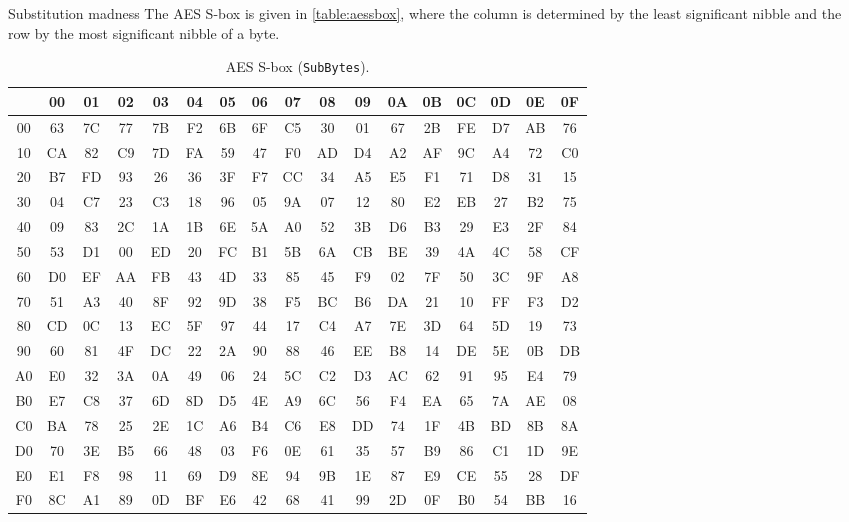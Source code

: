 \documentclass{practice}
\begin{document}
\begin{task}{Substitution madness}
  The AES S-box is given in \autoref{table:aessbox}, where the column is determined by the least significant nibble and the row by the most significant nibble of a byte.
  \begin{table}[h!]
    \centering
    \ttfamily
    \begin{tabular}{@{}c|cccccccccccccccc@{}}
         & 00 & 01 & 02 & 03 & 04 & 05 & 06 & 07 & 08 & 09 & 0A & 0B & 0C & 0D & 0E & 0F\\
      \midrule
      00 & 63 & 7C & 77 & 7B & F2 & 6B & 6F & C5 & 30 & 01 & 67 & 2B & FE & D7 & AB & 76\\
      10 & CA & 82 & C9 & 7D & FA & 59 & 47 & F0 & AD & D4 & A2 & AF & 9C & A4 & 72 & C0\\
      20 & B7 & FD & 93 & 26 & 36 & 3F & F7 & CC & 34 & A5 & E5 & F1 & 71 & D8 & 31 & 15\\
      30 & 04 & C7 & 23 & C3 & 18 & 96 & 05 & 9A & 07 & 12 & 80 & E2 & EB & 27 & B2 & 75\\
      40 & 09 & 83 & 2C & 1A & 1B & 6E & 5A & A0 & 52 & 3B & D6 & B3 & 29 & E3 & 2F & 84\\
      50 & 53 & D1 & 00 & ED & 20 & FC & B1 & 5B & 6A & CB & BE & 39 & 4A & 4C & 58 & CF\\
      60 & D0 & EF & AA & FB & 43 & 4D & 33 & 85 & 45 & F9 & 02 & 7F & 50 & 3C & 9F & A8\\
      70 & 51 & A3 & 40 & 8F & 92 & 9D & 38 & F5 & BC & B6 & DA & 21 & 10 & FF & F3 & D2\\
      80 & CD & 0C & 13 & EC & 5F & 97 & 44 & 17 & C4 & A7 & 7E & 3D & 64 & 5D & 19 & 73\\
      90 & 60 & 81 & 4F & DC & 22 & 2A & 90 & 88 & 46 & EE & B8 & 14 & DE & 5E & 0B & DB\\
      A0 & E0 & 32 & 3A & 0A & 49 & 06 & 24 & 5C & C2 & D3 & AC & 62 & 91 & 95 & E4 & 79\\
      B0 & E7 & C8 & 37 & 6D & 8D & D5 & 4E & A9 & 6C & 56 & F4 & EA & 65 & 7A & AE & 08\\
      C0 & BA & 78 & 25 & 2E & 1C & A6 & B4 & C6 & E8 & DD & 74 & 1F & 4B & BD & 8B & 8A\\
      D0 & 70 & 3E & B5 & 66 & 48 & 03 & F6 & 0E & 61 & 35 & 57 & B9 & 86 & C1 & 1D & 9E\\
      E0 & E1 & F8 & 98 & 11 & 69 & D9 & 8E & 94 & 9B & 1E & 87 & E9 & CE & 55 & 28 & DF\\
      F0 & 8C & A1 & 89 & 0D & BF & E6 & 42 & 68 & 41 & 99 & 2D & 0F & B0 & 54 & BB & 16
    \end{tabular}
    \caption{AES S-box (\texttt{SubBytes}).}
    \label{table:aessbox}
  \end{table}


\end{task}
\end{document}
